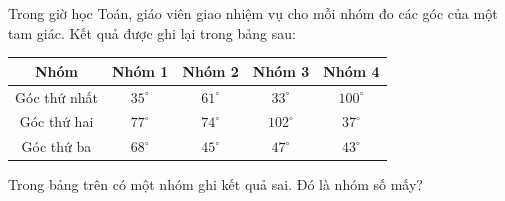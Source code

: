 \begin{ex}
Trong giờ học Toán, giáo viên giao nhiệm vụ cho mỗi nhóm đo các góc của một tam giác. Kết quả được ghi lại trong bảng sau:
\begin{center}
\begin{tabular}{|c|c|c|c|c|}\hline
Nhóm & Nhóm 1 & Nhóm 2 & Nhóm 3 & Nhóm 4\\\hline
Góc thứ nhất & $35^\circ$ & $61^\circ$ & $33^\circ$ & $100^\circ$\\\hline
Góc thứ hai & $77^\circ$ & $74^\circ$ & $102^\circ$ & $37^\circ$\\\hline
Góc thứ ba & $68^\circ$ & $45^\circ$ & $47^\circ$ & $43^\circ$\\\hline
\end{tabular}
\end{center}
Trong bảng trên có một nhóm ghi kết quả sai. Đó là nhóm số mấy?
\end{ex}
